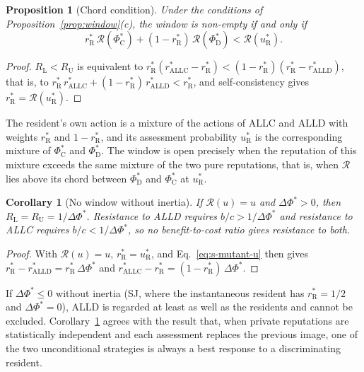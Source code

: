 \documentclass[10pt]{wlscirep}
\newcommand{\Rmap}{\mathscr{R}}            %
\newcommand{\rR}{r_{\mathrm{R}}^{*}}
\newcommand{\uR}{u_{\mathrm{R}}^{*}}
\newcommand{\PhiCs}{\Phi^{*}_{\mathrm{C}}}
\newcommand{\PhiDs}{\Phi^{*}_{\mathrm{D}}}
\newcommand{\dPhi}{\Delta\Phi^{*}}
\newcommand{\ALLC}{\mathrm{ALLC}}
\newcommand{\ALLD}{\mathrm{ALLD}}
\theoremstyle{plain}
\newtheorem{proposition}[lemma]{Proposition}
\newtheorem{corollary}[lemma]{Corollary}
\theoremstyle{remark}
\begin{document}
\begin{proposition}[Chord condition]\label{prop:chord}
Under the conditions of Proposition~\ref{prop:window}(c), the window is non-empty if and only if
\begin{equation}
\rR\,\Rmap(\PhiCs)+(1-\rR)\,\Rmap(\PhiDs)<\Rmap(\uR).
\label{eq:s-chord}
\end{equation}
\end{proposition}
\begin{proof}
$R_{\mathrm L}<R_{\mathrm U}$ is equivalent to $\rR(r^*_{\ALLC}-\rR)<(1-\rR)(\rR-r^*_{\ALLD})$, that is, to $\rR\,r^*_{\ALLC}+(1-\rR)\,r^*_{\ALLD}<\rR$, and self-consistency gives $\rR=\Rmap(\uR)$.
\end{proof}

The resident's own action is a mixture of the actions of ALLC and ALLD with weights $\rR$ and $1-\rR$, and its assessment probability $\uR$ is the corresponding mixture of $\PhiCs$ and $\PhiDs$. The window is open precisely when the reputation of this mixture exceeds the same mixture of the two pure reputations, that is, when $\Rmap$ lies above its chord between $\PhiDs$ and $\PhiCs$ at $\uR$.

\begin{corollary}[No window without inertia]\label{cor:nowindow}
If $\Rmap(u)=u$ and $\dPhi>0$, then $R_{\mathrm L}=R_{\mathrm U}=1/\dPhi$. Resistance to ALLD requires $b/c>1/\dPhi$ and resistance to ALLC requires $b/c<1/\dPhi$, so no benefit-to-cost ratio gives resistance to both.
\end{corollary}
\begin{proof}
With $\Rmap(u)=u$, $\rR=\uR$, and Eq.~\eqref{eq:s-mutant-u} then gives $\rR-r^*_{\ALLD}=\rR\,\dPhi$ and $r^*_{\ALLC}-\rR=(1-\rR)\,\dPhi$.
\end{proof}

If $\dPhi\leq0$ without inertia (SJ, where the instantaneous resident has $\rR=1/2$ and $\dPhi=0$), ALLD is regarded at least as well as the residents and cannot be excluded. Corollary~\ref{cor:nowindow} agrees with the result that, when private reputations are statistically independent and each assessment replaces the previous image, one of the two unconditional strategies is always a best response to a discriminating resident.
\end{document}
